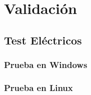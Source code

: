 \chapter{Validación}

\section{Test Eléctricos}
\subsection{Prueba en Windows}
\subsection{Prueba en Linux}